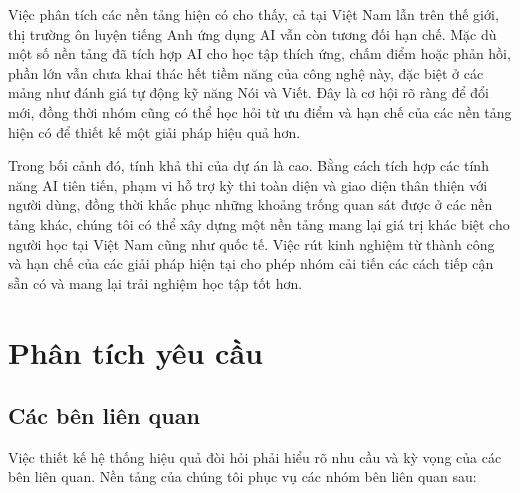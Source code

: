 Việc phân tích các nền tảng hiện có cho thấy, cả tại Việt Nam lẫn trên thế giới, thị trường ôn luyện tiếng Anh ứng dụng AI vẫn còn tương đối hạn chế. Mặc dù một số nền tảng đã tích hợp AI cho học tập thích ứng, chấm điểm hoặc phản hồi, phần lớn vẫn chưa khai thác hết tiềm năng của công nghệ này, đặc biệt ở các mảng như đánh giá tự động kỹ năng Nói và Viết. Đây là cơ hội rõ ràng để đổi mới, đồng thời nhóm cũng có thể học hỏi từ ưu điểm và hạn chế của các nền tảng hiện có để thiết kế một giải pháp hiệu quả hơn.

Trong bối cảnh đó, tính khả thi của dự án là cao. Bằng cách tích hợp các tính năng AI tiên tiến, phạm vi hỗ trợ kỳ thi toàn diện và giao diện thân thiện với người dùng, đồng thời khắc phục những khoảng trống quan sát được ở các nền tảng khác, chúng tôi có thể xây dựng một nền tảng mang lại giá trị khác biệt cho người học tại Việt Nam cũng như quốc tế. Việc rút kinh nghiệm từ thành công và hạn chế của các giải pháp hiện tại cho phép nhóm cải tiến các cách tiếp cận sẵn có và mang lại trải nghiệm học tập tốt hơn.

\section{Phân tích yêu cầu}

\subsection{Các bên liên quan}

Việc thiết kế hệ thống hiệu quả đòi hỏi phải hiểu rõ nhu cầu và kỳ vọng của các bên liên quan. Nền tảng của chúng tôi phục vụ các nhóm bên liên quan sau:


